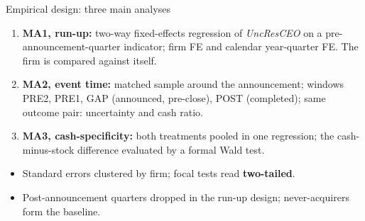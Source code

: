 \documentclass[aspectratio=169, 11pt]{beamer}
\begin{document}
\begin{frame}{Empirical design: three main analyses}
  \begin{enumerate}
    \item \textbf{MA1, run-up:} two-way fixed-effects regression of
      \textit{UncResCEO} on a pre-announcement-quarter indicator; firm FE and
      calendar year-quarter FE. The firm is compared against itself.
    \item \textbf{MA2, event time:} matched sample around the announcement;
      windows PRE2, PRE1, GAP (announced, pre-close), POST (completed);
      same outcome pair: uncertainty and cash ratio.
    \item \textbf{MA3, cash-specificity:} both treatments pooled in one
      regression; the cash-minus-stock difference evaluated by a formal Wald test.
  \end{enumerate}
  \vspace{0.5em}
  \begin{itemize}
    \item Standard errors clustered by firm; focal tests read \textbf{two-tailed}.
    \item Post-announcement quarters dropped in the run-up design;
      never-acquirers form the baseline.
  \end{itemize}
\end{frame}
\end{document}
